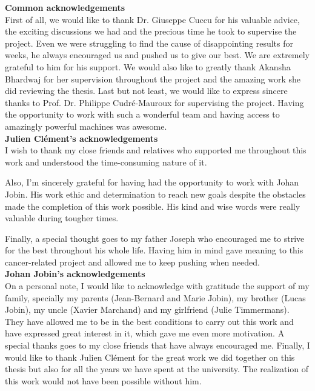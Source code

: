 
\textbf{Common acknowledgements}\\
First of all, we would like to thank Dr. Giuseppe Cuccu for his valuable advice, the exciting discussions we had and the precious time he took to supervise the project. Even we were struggling to find the cause of disappointing results for weeks, he always encouraged us and pushed us to give our best. We are extremely grateful to him for his support. We would also like to greatly thank Akansha Bhardwaj for her supervision throughout the project and the amazing work she did reviewing the thesis. Last but not least, we would like to express sincere thanks to Prof. Dr. Philippe Cudré-Mauroux for supervising the project. Having the opportunity to work with such a wonderful team and having access to amazingly powerful machines was awesome.\\

\noindent \textbf{Julien Clément's acknowledgements}\\
I wish to thank my close friends and relatives who supported me throughout this work and understood the time-consuming nature of it. 

\noindent Also, I’m sincerely grateful for having had the opportunity to work with Johan Jobin. His work ethic and determination to reach new goals despite the obstacles made the completion of this work possible. His kind and wise words were really valuable during tougher times. 

\noindent Finally, a special thought goes to my father Joseph who encouraged me to strive for the best throughout his whole life. Having him in mind gave meaning to this cancer-related project and allowed me to keep pushing when needed.\\

\noindent \textbf{Johan Jobin's acknowledgements}\\
On a personal note, I would like to acknowledge with gratitude the support of my family, specially my parents (Jean-Bernard and Marie Jobin), my brother (Lucas Jobin), my uncle (Xavier Marchand) and my girlfriend (Julie Timmermans). They have allowed me to be in the best conditions to carry out this work and have expressed great interest in it, which gave me even more motivation. A special thanks goes to my close friends that have always encouraged me. Finally, I would like to thank Julien Clément for the great work we did together on this thesis but also for all the years we have spent at the university. The realization of this work would not have been possible without him.